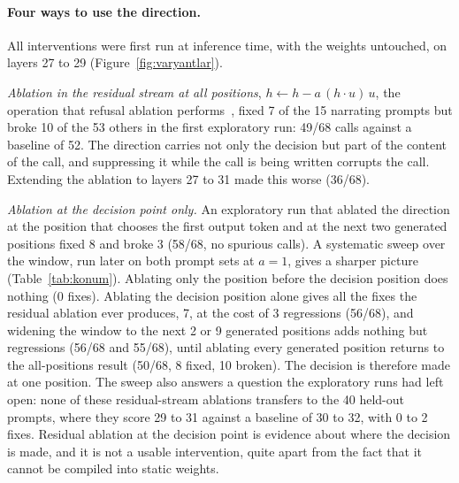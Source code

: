 \documentclass[11pt]{article}
\begin{document}
\paragraph{Four ways to use the direction.} All interventions were first run at inference time, with the weights untouched, on layers 27 to 29 (Figure~\ref{fig:varyantlar}).

\emph{Ablation in the residual stream at all positions}, $h \leftarrow h - a\,(h\cdot u)\,u$, the operation that refusal ablation performs~\citep{arditi2024refusal}, fixed 7 of the 15 narrating prompts but broke 10 of the 53 others in the first exploratory run: 49/68 calls against a baseline of 52. The direction carries not only the decision but part of the content of the call, and suppressing it while the call is being written corrupts the call. Extending the ablation to layers 27 to 31 made this worse (36/68).

\emph{Ablation at the decision point only.} An exploratory run that ablated the direction at the position that chooses the first output token and at the next two generated positions fixed 8 and broke 3 (58/68, no spurious calls). A systematic sweep over the window, run later on both prompt sets at $a=1$, gives a sharper picture (Table~\ref{tab:konum}). Ablating only the position before the decision position does nothing (0 fixes). Ablating the decision position alone gives all the fixes the residual ablation ever produces, 7, at the cost of 3 regressions (56/68), and widening the window to the next 2 or 9 generated positions adds nothing but regressions (56/68 and 55/68), until ablating every generated position returns to the all-positions result (50/68, 8 fixed, 10 broken). The decision is therefore made at one position. The sweep also answers a question the exploratory runs had left open: none of these residual-stream ablations transfers to the 40 held-out prompts, where they score 29 to 31 against a baseline of 30 to 32, with 0 to 2 fixes. Residual ablation at the decision point is evidence about where the decision is made, and it is not a usable intervention, quite apart from the fact that it cannot be compiled into static weights.
\end{document}
